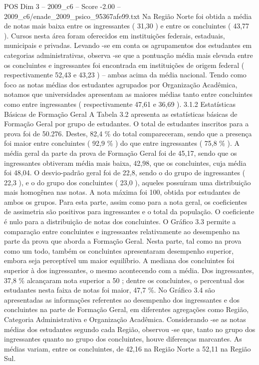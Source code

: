 \begin{textsample}{POS Dim 3 – 2009\_c6 – Score -2.00 – 2009\_c6/enade\_2009\_psico\_95367afe99.txt}
Na Região Norte foi obtida a média de notas mais baixa entre os ingressantes ( 31,30 ) e entre os concluintes ( 43,77 ).
Cursos nesta área foram oferecidos em instituições federais, estaduais, municipais e privadas.
Levando -se em conta os agrupamentos dos estudantes em categorias administrativas, observa -se que a pontuação média mais elevada entre os concluintes e ingressantes foi encontrada em instituições de origem federal ( respectivamente 52,43 e 43,23 ) – ambas acima da média nacional.
Tendo como foco as notas médias dos estudantes agrupados por Organização Acadêmica, notamos que universidades apresentam as maiores médias tanto entre concluintes como entre ingressantes ( respectivamente 47,61 e 36,69 ). 3.1.2 Estatísticas Básicas de Formação Geral A Tabela 3.2 apresenta as estatísticas básicas de Formação Geral por grupo de estudantes.
O total de estudantes inscritos para a prova foi de 50.276.
Destes, 82,4 \% do total compareceram, sendo que a presença foi maior entre concluintes ( 92,9 \% ) do que entre ingressantes ( 75,8 \% ).
A média geral da parte da prova de Formação Geral foi de 45,17, sendo que os ingressantes obtiveram média mais baixa, 42,98, que os concluintes, cuja média foi 48,04.
O desvio-padrão geral foi de 22,8, sendo o do grupo de ingressantes ( 22,3 ), e o do grupo dos concluintes ( 23,0 ), aqueles possuíram uma distribuição mais homogênea nas notas.
A nota máxima foi 100, obtida por estudantes de ambos os grupos.
Para esta parte, assim como para a nota geral, os coeficientes de assimetria são positivos para ingressantes e o total da população.
O coeficiente é nulo para a distribuição de notas dos concluintes.
O Gráfico 3.3 permite a comparação entre concluintes e ingressantes relativamente ao desempenho na parte da prova que aborda a Formação Geral.
Nesta parte, tal como na prova como um todo, também os concluintes apresentaram desempenho superior, embora seja perceptível um maior equilíbrio.
A mediana dos concluintes foi superior à dos ingressantes, o mesmo acontecendo com a média.
Dos ingressantes, 37,8 \% alcançaram nota superior a 50 ; dentre os concluintes, o percentual dos estudantes nesta faixa de notas foi maior, 47,7 \%.
No Gráfico 3.4 são apresentadas as informações referentes ao desempenho dos ingressantes e dos concluintes na parte de Formação Geral, em diferentes agregações como Região, Categoria Administrativa e Organização Acadêmica.
Considerando -se as notas médias dos estudantes segundo cada Região, observou -se que, tanto no grupo dos ingressantes quanto no grupo dos concluintes, houve diferenças marcantes.
As médias variam, entre os concluintes, de 42,16 na Região Norte a 52,11 na Região Sul.

\end{textsample}
